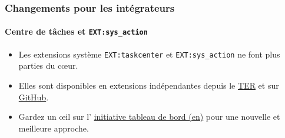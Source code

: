 
\begin{frame}[fragile]
	\frametitle{Changements pour les intégrateurs}
	\framesubtitle{Centre de tâches et \texttt{EXT:sys\_action}}

	\begin{itemize}

		\item Les extensions système \texttt{EXT:taskcenter} et \texttt{EXT:sys\_action}
			ne font plus parties du cœur.

		\item Elles sont disponibles en extensions indépendantes depuis le
			\href{https://extensions.typo3.org/}{TER}
			et sur \href{https://github.com/FriendsOfTYPO3}{GitHub}.

		\item Gardez un œil sur l'
			\href{https://typo3.org/community/teams/typo3-development/initiatives/typo3-dashboard-initiative/}{initiative tableau de bord (en)}
			pour une nouvelle et meilleure approche.

	\end{itemize}

\end{frame}


